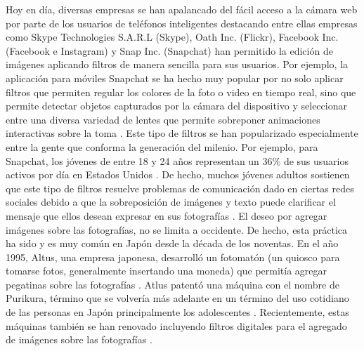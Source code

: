 \documentclass[a4paper,openright,12pt]{report}
\begin{document}
Hoy en día, diversas empresas se han apalancado del fácil acceso a la cámara web
por parte de los usuarios de teléfonos inteligentes destacando entre ellas
empresas como Skype Technologies S.A.R.L (Skype), Oath Inc. (Flickr),
Facebook Inc. (Facebook e Instagram) y Snap Inc. (Snapchat) han permitido la
edición de imágenes aplicando filtros de manera sencilla para sus usuarios. Por
ejemplo, la aplicación para móviles Snapchat se ha hecho muy popular por no solo
aplicar filtros que permiten regular los colores de la foto o video en tiempo
real, sino que permite detectar objetos capturados por la cámara del dispositivo
y seleccionar entre una diversa variedad de lentes que permite sobreponer
animaciones interactivas sobre la toma \cite{snap2017prospectus}⁠. Este tipo de
filtros se han popularizado especialmente entre la gente que conforma la
generación del milenio. Por ejemplo, para
Snapchat, los jóvenes de entre 18 y 24 años representan un 36\% de sus usuarios
activos por día en Estados Unidos \cite{snap2017prospectus}⁠. De hecho, muchos
jóvenes adultos sostienen que este tipo de filtros resuelve problemas de
comunicación dado en ciertas redes sociales debido a que la sobreposición de
imágenes y texto puede clarificar el mensaje que ellos desean expresar en sus
fotografías \cite{vaterlaus2016snapchat}. El deseo por agregar imágenes sobre
las fotografías, no se limita a occidente. De hecho, esta práctica ha sido y es
muy común en Japón desde la década de los noventas. En el año 1995, Altus, una
empresa japonesa, desarrolló un fotomatón (un quiosco para tomarse fotos,
generalmente insertando una moneda) que permitía agregar pegatinas sobre las
fotografías \cite{edwards2004photographs}. Atlus patentó una máquina con el
nombre de Purikura, término que se volvería más adelante en un término del uso
cotidiano de las personas en Japón principalmente los adolescentes
\cite{edwards2004photographs}. Recientemente, estas máquinas también se han
renovado incluyendo filtros digitales para el agregado de imágenes sobre las
fotografías \cite{TheOrigi29}.\\
\end{document}
